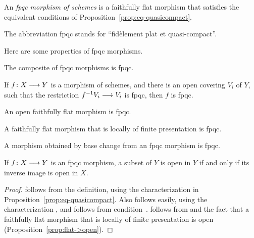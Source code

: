 \begin{2   CONTRAVARIANT FUNCTORS}
\begin{2.3 Sheaves in Grothendieck topologies}
\begin{definition}
An \emph{fpqc morphism of schemes}%
%
 is a faithfully flat morphism that satisfies the equivalent conditions of Proposition~\ref{prop:eq-quasicompact}.
\end{definition}

The  abbreviation fpqc stands for ``fid\`element plat et quasi-compact''.

Here are some properties of fpqc morphisms.

\begin{proposition}\hfil

\begin{enumeratei} %

 The composite of fpqc morphisms is fpqc.

 If $f \colon X \arr Y$ is a morphism of schemes, and there is an open covering $V_i$ of $Y$, such that the restriction $f^{-1}V_i \arr V_i$ is fpqc, then $f$ is fpqc.

 An open faithfully flat morphism is fpqc.

 A faithfully flat morphism that is locally of finite
presentation is fpqc.


 A morphism obtained by base change from an fpqc morphism is fpqc.

 If $f \colon X \arr Y$ is an fpqc morphism, a subset of $Y$ is open in $Y$ if and only if its inverse image is open in $X$.
\end{enumeratei}

\end{proposition}

\begin{proof}  follows from the definition, using the characterization  in Proposition~\ref{prop:eq-quasicompact}. Also  follows easily, using the characterization , and  follows from condition~.  follows from  and the fact that a faithfully flat morphism that is locally of finite presentation is open (Proposition~\ref{prop:flat->open}).


\end{proof}
\end{2.3 Sheaves in Grothendieck topologies}
\end{2   CONTRAVARIANT FUNCTORS}
